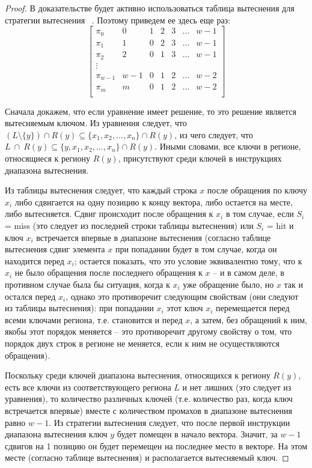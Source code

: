 \begin{proof}
  В доказательстве будет активно использоваться таблица вытеснения
  для стратегии вытеснения \LRU~\cite{policy_tables}. Поэтому
  приведем ее здесь еще раз:
  $$
  \left[
    \begin{array}{c|cccccc}
      \pi_0 & 0 & 1 & 2 & 3 & \dots & w{-}1 \\
      \pi_1 & 1 & 0 & 2 & 3 & \dots & w{-}1 \\
      \pi_2 & 2 & 0 & 1 & 3 & \dots & w{-}1 \\
      \vdots &  &  &  & & & \\
      \pi_{w-1} & w{-}1 & 0 & 1 & 2 & \dots & w{-}2 \\
      \pi_m & m & 0 & 1 & 2 & \dots & w{-}2 \\
    \end{array}
  \right]
  $$

  Сначала докажем, что если уравнение имеет решение, то это решение
  является вытесняемым ключом. Из уравнения следует, что
  $(L\setminus\{y\}) \cap R(y) \subseteq \{x_1, x_2, ..., x_n\} \cap
  R(y)$, из чего следует, что $L~\cap~R(y) \subseteq \{y, x_1, x_2,
  ..., x_n\} \cap R(y)$. Иными словами, все ключи в регионе, относящиеся
  к региону $R(y)$, присутствуют среди ключей в инструкциях диапазона вытеснения.

  Из таблицы вытеснения следует, что каждый строка $x$ после
  обращения по ключу $x_i$ либо сдвигается на одну позицию к
  концу вектора, либо остается на месте, либо вытесняется. Сдвиг
  происходит после обращения к $x_i$ в том случае, если $S_i$ = miss
  (это следует из последней строки таблицы вытеснения) или $S_i$ = hit
   и ключ $x_i$ встречается впервые в диапазоне вытеснения (согласно таблице
  вытеснения сдвиг элемента $x$ при попадании будет в том случае, когда
  он находится перед $x_i$; остается показать, что это условие
  эквивалентно тому, что к $x_i$ не было обращения после последнего
  обращения к $x$ -- и в самом деле, в противном случае была бы
  ситуация, когда к $x_i$ уже обращение было, но $x$ так и остался
  перед $x_i$, однако это противоречит следующим свойствам (они
  следуют из таблицы вытеснения): при попадании $x_i$ этот ключ
  $x_i$ перемещается перед всеми ключами региона, т.е. становится и перед $x$, а затем, без обращений к ним, якобы этот порядок меняется -- это противоречит другому
  свойству о том, что порядок двух строк в регионе не меняется, если
  к ним не осуществляются обращения).

  Поскольку среди ключей диапазона вытеснения, относящихся к региону $R(y)$,
  есть все ключи из соответствующего региона $L$ и
  нет лишних (это следует из уравнения), то количество различных
  ключей (т.е. количество раз, когда ключ встречается впервые) вместе с
  количеством промахов в диапазоне вытеснения равно $w{-}1$. Из
  стратегии вытеснения следует, что после первой инструкции
  диапазона вытеснения ключ $y$ будет помещен в начало вектора.
  Значит, за $w{-}1$ сдвигов на 1 позицию он будет перемещен на
  последнее место в векторе. На этом месте (согласно таблице вытеснения)
  и располагается вытесняемый ключ.


\end{proof}
